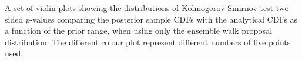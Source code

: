 \label{fig:walkpropks}
A set of violin plots showing the distributions of Kolmogorov-Smirnov test
two-sided $p$-values comparing the posterior sample CDFs with the analytical
CDFs as a function of the prior range, when using only the ensemble walk proposal distribution. The different colour plot represent different numbers of live points used.
